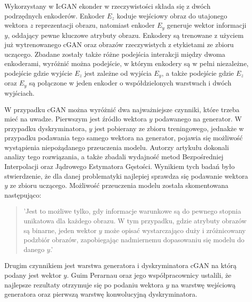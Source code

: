     Wykorzystany w IcGAN ekonder w rzeczywistości składa się z dwóch podrzędnych
    enkoderów. Enkoder $E_{z}$ koduje wejściowy obraz do utajonego wektora $z$ reprezentacji
    obrazu, natomiast enkoder $E_{y}$ generuje wektor informacji $y$, oddający
    pewne kluczowe atrybuty obrazu. Enkodery są trenowane z użyciem już wytrenowanego
    cGAN oraz obrazów rzeczywistych z etykietami ze zbioru uczącego. Zbadane
    zostały także różne podejścia interakcji między dwoma enkoderami, wyróżnić
    można podejście, w którym enkodery są w pełni niezależne, podejście
    gdzie wyjście $E_{z}$ jest zależne od wyjścia $E_{y}$, a także podejście
    gdzie $E_{z}$ oraz $E_{y}$ są połączone w jeden enkoder o współdzielonych
    warstwach i dwóch wyjściach.

    W przypadku cGAN można wyróżnić dwa najważniejsze czynniki, które trzeba
    mieć na uwadze. Pierwszym jest źródło wektora $y$ podawanego na
    generator. W przypadku dyskryminatora, $y$ jest pobierany ze
    zbioru treningowego, jednakże w przypadku podawania tego
    samego wektora na generator, pojawia się możliwość wystąpienia niepożądanego
    przeuczenia modelu. Autorzy artykułu dokonali analizy tego rozwiązania,
    a także zbadali wydajność metod Bezpośredniej Interpolacji oraz
    Jądrowego Estymatora Gęstości. Wynikiem tych badań było stwierdzenie, że
    dla danej problematyki najlepiej sprawdza się podawanie wektora $y$ ze zbioru
    uczącego. Możliwość przeuczenia modelu została skomentowana następująco:
    \begin{quote}
      'Jest to możliwe tylko, gdy informacje warunkowe są do pewnego stopnia
      unikatowa dla każdego obrazu. W tym przypadku, gdzie atrybuty obrazów są
      binarne, jeden wektor $y$ może opisać wystarczająco duży i zróżnicowany
      podzbiór obrazów, zapobiegając nadmiernemu dopasowaniu się modelu do
      danego $y$.'
    \end{quote}

    Drugim czynnikiem jest warstwa generatora i dyskryminatora cGAN na
    którą podany jest wektor $y$. Guim Perarnau oraz jego współpracownicy ustalili, że najlepsze rezultaty otrzymuje się po podaniu wektora $y$ na warstwę wejściową
    generatora oraz pierwszą warstwę konwolucyjną dyskryminatora.

